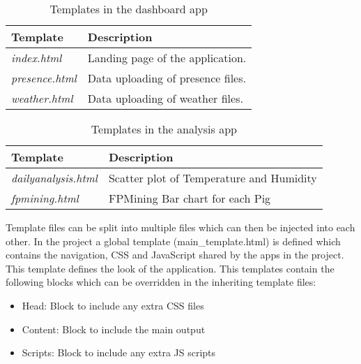 \begin{table}[H]
	\centering
	\begin{tabular}{ | m{} | m{} | }
		\hline
		\textbf{Template} & \textbf{Description} \\
		\hline \hline
		\emph{index.html} & Landing page of the application. \\
		\hline
		\emph{presence.html} & Data uploading of presence files. \\
		\hline
		\emph{weather.html} & Data uploading of weather files. \\
		\hline
	\end{tabular}
	\caption{Templates in the dashboard app}
	\label{tab:dashboard_templates}
\end{table}

\begin{table}[H]
	\centering
	\begin{tabular}{ | m{} | m{} | }
		\hline
		\textbf{Template} & \textbf{Description} \\
		\hline \hline
		\emph{dailyanalysis.html} & Scatter plot of Temperature and Humidity \\
		\hline
		\emph{fpmining.html} & FPMining Bar chart for each Pig \\
		\hline
	\end{tabular}
	\caption{Templates in the analysis app}
	\label{tab:analysis_templates}
\end{table}

Template files can be split into multiple files which can then be injected into each other. In the project a global template (main\_template.html)
is defined which contains the navigation, CSS and JavaScript shared by the apps in the project. This template defines the look of the application.
This templates contain the following blocks which can be overridden in the inheriting template files:
\begin{itemize}
	\item Head: Block to include any extra CSS files
	\item Content: Block to include the main output
	\item Scripts: Block to include any extra JS scripts
\end{itemize}

